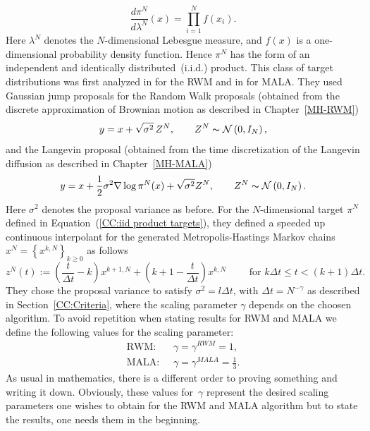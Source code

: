 \begin{equation}
 \label{CC:iid product targets}
 \frac{d \pi^{N}}{d \lambda^{N}}(x) = \prod_{i=1}^{N} f(x_i).
\end{equation}
Here $ \lambda^{N} $ denotes the $N$-dimensional Lebesgue measure, and $f(x)$ is a one-dimensional probability density function. Hence $\pi^{N}$ has the form of an independent and identically distributed~(i.i.d.) product. This class of target distributions was first analyzed in \autocite{Roberts1997} for the RWM and in \autocite{Roberts1998} for MALA. They used Gaussian jump proposals for the Random Walk proposals (obtained from the discrete approximation of Brownian motion as described in Chapter~\ref{MH-RWM})
\begin{equation}
 \label{CC:RWMPoposals}
 y = x + \sqrt{\sigma^2}\,Z^{N}, \qquad Z^{N} \thicksim \mathcal{N}\left( 0,I_N \right),
\end{equation}
and the Langevin proposal (obtained from the time discretization of the Langevin diffusion as described in Chapter~\ref{MH-MALA})
\begin{equation}
 \label{CC:MALAProposals}
 y = x + \frac{1}{2} \sigma^2 \nabla \log \pi^{N} (x) + \sqrt{\sigma^2} Z^N, \qquad Z^{N} \thicksim \mathcal{N}\left( 0,I_N \right).
\end{equation}
Here $\sigma^2 $ denotes the proposal variance as before.  For the $N$-dimensional target $\pi^{N}$ defined in Equation~(\ref{CC:iid product targets}), they defined a speeded up continuous interpolant for the generated Metropolis-Hastings Markov chains $ x^{N} = \left\{ x^{k,N}\right\}_{k \geq 0} $ as follows
\begin{equation}
\label{CC:Continuous interpolant 2}
 z^{N}(t) := \left( \frac{t}{\Delta t} -k \right) x^{k+1,N} + \left( k+1 - \frac{t}{\Delta t} \right) x^{k,N} \qquad \text{ for } k \Delta t \leq t < (k+1)\Delta t.
\end{equation}
They chose the proposal variance to satisfy $ \sigma^2 = l \Delta t $, with $ \Delta t = N^{-\gamma} $ as described in Section~\ref{CC:Criteria}, where the scaling parameter $\gamma$ depends on the choosen algorithm. To avoid repetition when stating results for RWM and MALA we define the following values for the scaling parameter:
\begin{align}
 \text{RWM: } & \; \gamma = \gamma^{RWM} = 1, \\
 \text{MALA: } & \; \gamma = \gamma^{MALA} = \frac{1}{3}.
\end{align}
As usual in mathematics, there is a different order to proving something and writing it down. Obviously, these values for~$\gamma$ represent the desired scaling parameters one wishes to obtain for the RWM and MALA algorithm but to state the results, one needs them in the beginning.


